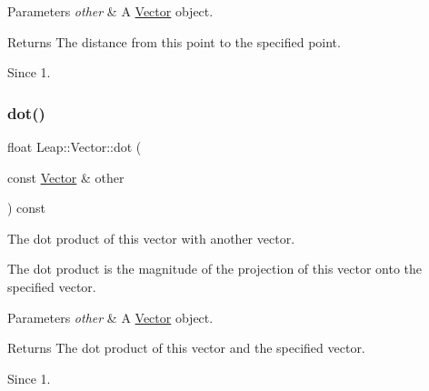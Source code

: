 \begin{DoxyParams}{Parameters}
{\em other} & A \hyperlink{struct_leap_1_1_vector}{Vector} object. \\
\hline
\end{DoxyParams}
\begin{DoxyReturn}{Returns}
The distance from this point to the specified point. 
\end{DoxyReturn}
\begin{DoxySince}{Since}
1. 
\end{DoxySince}
\mbox{\label{struct_leap_1_1_vector_a2a1f2fbbd208e3aeb9b51d0783780458}} 
\subsubsection{\texorpdfstring{dot()}{dot()}}
{\footnotesize\ttfamily float Leap\+::\+Vector\+::dot (\begin{DoxyParamCaption}\item[{const \hyperlink{struct_leap_1_1_vector}{Vector} \&}]{other }\end{DoxyParamCaption}) const\hspace{0.3cm}{\ttfamily [inline]}}

The dot product of this vector with another vector.

The dot product is the magnitude of the projection of this vector onto the specified vector.




\begin{DoxyCodeInclude}
\end{DoxyCodeInclude}



\begin{DoxyParams}{Parameters}
{\em other} & A \hyperlink{struct_leap_1_1_vector}{Vector} object. \\
\hline
\end{DoxyParams}
\begin{DoxyReturn}{Returns}
The dot product of this vector and the specified vector. 
\end{DoxyReturn}
\begin{DoxySince}{Since}
1. 
\end{DoxySince}
\mbox{\label{struct_leap_1_1_vector_ac1c62a2d280d7a7c67e99f1996076b58}} 
